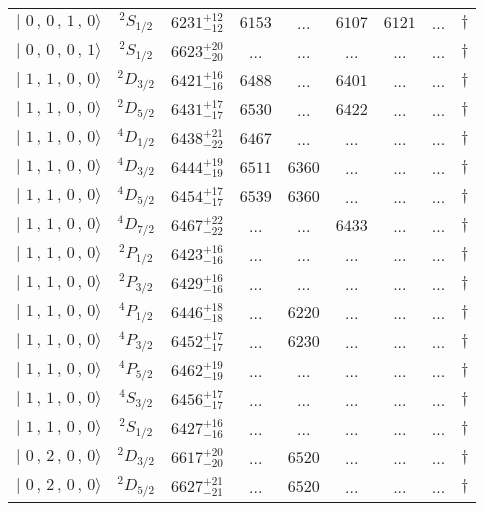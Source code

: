 \begin{tabular}{c c| c c c c c c c}
$\vert \,\,0\,,\,0\,,\,1\,,\,0 \rangle $ & $^{2}S_{1/2}$ & $6231^{+12}_{-12}$ & $6153$ & ... & $6107$ & $6121$ & ... & $\dagger$ \\ 
$\vert \,\,0\,,\,0\,,\,0\,,\,1 \rangle $ & $^{2}S_{1/2}$ & $6623^{+20}_{-20}$ & ... & ... & ... & ... & ... & $\dagger$ \\ 
$\vert \,\,1\,,\,1\,,\,0\,,\,0 \rangle $ & $^{2}D_{3/2}$ & $6421^{+16}_{-16}$ & $6488$ & ... & $6401$ & ... & ... & $\dagger$ \\ 
$\vert \,\,1\,,\,1\,,\,0\,,\,0 \rangle $ & $^{2}D_{5/2}$ & $6431^{+17}_{-17}$ & $6530$ & ... & $6422$ & ... & ... & $\dagger$ \\ 
$\vert \,\,1\,,\,1\,,\,0\,,\,0 \rangle $ & $^{4}D_{1/2}$ & $6438^{+21}_{-22}$ & $6467$ & ... & ... & ... & ... & $\dagger$ \\ 
$\vert \,\,1\,,\,1\,,\,0\,,\,0 \rangle $ & $^{4}D_{3/2}$ & $6444^{+19}_{-19}$ & $6511$ & $6360$ & ... & ... & ... & $\dagger$ \\ 
$\vert \,\,1\,,\,1\,,\,0\,,\,0 \rangle $ & $^{4}D_{5/2}$ & $6454^{+17}_{-17}$ & $6539$ & $6360$ & ... & ... & ... & $\dagger$ \\ 
$\vert \,\,1\,,\,1\,,\,0\,,\,0 \rangle $ & $^{4}D_{7/2}$ & $6467^{+22}_{-22}$ & ... & ... & $6433$ & ... & ... & $\dagger$ \\ 
$\vert \,\,1\,,\,1\,,\,0\,,\,0 \rangle $ & $^{2}P_{1/2}$ & $6423^{+16}_{-16}$ & ... & ... & ... & ... & ... & $\dagger$ \\ 
$\vert \,\,1\,,\,1\,,\,0\,,\,0 \rangle $ & $^{2}P_{3/2}$ & $6429^{+16}_{-16}$ & ... & ... & ... & ... & ... & $\dagger$ \\ 
$\vert \,\,1\,,\,1\,,\,0\,,\,0 \rangle $ & $^{4}P_{1/2}$ & $6446^{+18}_{-18}$ & ... & $6220$ & ... & ... & ... & $\dagger$ \\ 
$\vert \,\,1\,,\,1\,,\,0\,,\,0 \rangle $ & $^{4}P_{3/2}$ & $6452^{+17}_{-17}$ & ... & $6230$ & ... & ... & ... & $\dagger$ \\ 
$\vert \,\,1\,,\,1\,,\,0\,,\,0 \rangle $ & $^{4}P_{5/2}$ & $6462^{+19}_{-19}$ & ... & ... & ... & ... & ... & $\dagger$ \\ 
$\vert \,\,1\,,\,1\,,\,0\,,\,0 \rangle $ & $^{4}S_{3/2}$ & $6456^{+17}_{-17}$ & ... & ... & ... & ... & ... & $\dagger$ \\ 
$\vert \,\,1\,,\,1\,,\,0\,,\,0 \rangle $ & $^{2}S_{1/2}$ & $6427^{+16}_{-16}$ & ... & ... & ... & ... & ... & $\dagger$ \\ 
$\vert \,\,0\,,\,2\,,\,0\,,\,0 \rangle $ & $^{2}D_{3/2}$ & $6617^{+20}_{-20}$ & ... & $6520$ & ... & ... & ... & $\dagger$ \\ 
$\vert \,\,0\,,\,2\,,\,0\,,\,0 \rangle $ & $^{2}D_{5/2}$ & $6627^{+21}_{-21}$ & ... & $6520$ & ... & ... & ... & $\dagger$ \\ 
\hline \hline
\end{tabular}
